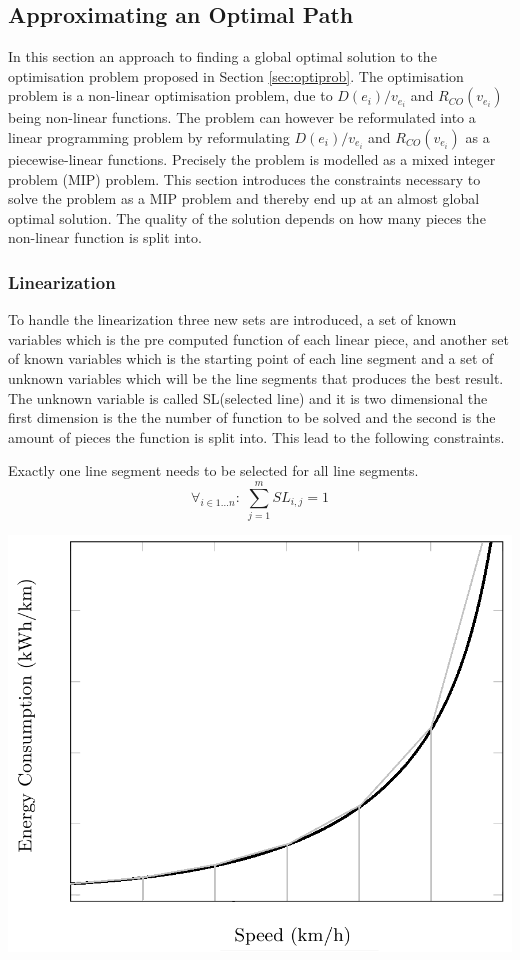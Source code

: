 
\subsection{Approximating an Optimal Path}\label{sec:LP}
In this section an approach to finding a global optimal solution to the optimisation problem proposed in Section \ref{sec:optiprob}. The optimisation problem is a non-linear optimisation problem, due to \( D(e_i)/v_{e_i} \) and $R_{CO}(v_{e_i})$ being non-linear functions. The problem can however be reformulated into a linear programming problem by reformulating \( D(e_i)/v_{e_i} \) and $R_{CO}(v_{e_i})$ as a piecewise-linear functions. Precisely the problem is modelled as a mixed integer problem (MIP) problem. This section introduces the constraints necessary to solve the problem as a MIP problem and thereby end up at an almost global optimal solution. The quality of the solution depends on how many pieces the non-linear function is split into. 

\subsubsection{Linearization}
To handle the linearization three new sets are introduced, a set of known variables which is the pre computed function of each linear piece, and another set of known variables which is the starting point of each line segment and a set of unknown variables which will be the line segments that produces the best result. The unknown variable is called SL(selected line) and it is two dimensional the first dimension is the the number of function to be solved and the second is the amount of pieces the function is split into. This lead to the following constraints.  

Exactly one line segment needs to be selected for all line segments. 
\begin{equation*}
\forall_{i\in1 \dots n }:\; \sum_{j=1}^{m} SL_{i,j} = 1
\end{equation*}

\begin{center}
\includegraphics[scale=0.33]{images/linearization_example}
\label{fig:linearization_example}
\end{center}

